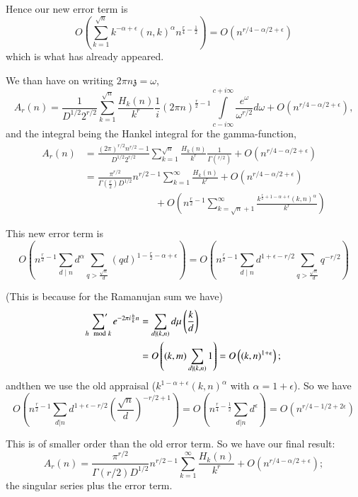 Hence our new error term is 
$$
O \left(\sum^{\sqrt{n}}_{k=1} k^{-\alpha + \epsilon} (n, k)^\alpha
n^{\frac{r}{4} - \frac{1}{2}}\right) = O \left(n^{r/4 -
  \alpha/2 + \epsilon} \right)
$$
which is what has already appeared.

We than have on writing $2 \pi n \mathfrak{z} = \omega$,
$$
A_r (n) = \frac{1}{D^{1/2} 2^{r/2}} \sum^{\sqrt{n}}_{k=1}
\frac{H_k(n)}{k^r} \frac{1}{i} (2 \pi n)^{\frac{r}{2}-1}
\int\limits^{c+ i \infty}_{c- i \infty} \frac{e^\omega}{\omega^{r/2}}
d \omega + O \left(n^{r/4- \alpha/2 + \epsilon} \right),
$$\pageoriginale
and the integral being the Hankel integral for the gamma-function,
\begin{align*}
  A_r (n) & = \frac{(2 \pi)^{r/2} n^{r/2}-1}{D^{1/2} 2^{r/2}}
  \sum^{\sqrt{n}}_{k=1} \frac{H_k (n)}{k^r} \frac{1}{\Gamma(^{r/2})} +
  O \left( n^{r/4 - \alpha/2 + \epsilon}\right)\\
  & = \frac{\pi^{r/2}}{\Gamma\left( \frac{r}{2}\right)D^{1/2}}
  n^{r/2-1} \sum^\infty_{k=1} \frac{H_k (n)}{k^r}+ O \left(
  n^{r/4- \alpha /2 + \epsilon}\right)\\ 
  & \hspace{3cm}+ O \left(n^{\frac{r}{2}-1}
  \sum^\infty_{k= \sqrt{n}+1}  \frac{k^{\frac{r}{2} +1 - \alpha + \epsilon}
    (k, n)^\alpha}{k^r}\right)
\end{align*}

This new error term is 
$$
O \left( n^{\frac{r}{2}-1} \sum_{d\mid n} d^\alpha \sum_{q>
  \frac{\sqrt{n}}{d}} (qd)^{1- \frac{r}{2} - \alpha + \epsilon} \right) =
O \left(n^{\frac{r}{2}-1} \sum_{d\mid n} d^{1+ \epsilon - r/2} \sum_{q>
    \frac{\sqrt{n}}{d}} q^{- r/2}  \right)
$$

(This is because for the Ramanujan sum we have)
\begin{align*}
  \sideset{}{'}\sum_{h \mod k} e^{-2 \pi i \frac{h}{k}n} & =
  \sum_{d|(k, n)} d \mu \left(\frac{k}{d} \right)\\
  & = O \left((k, m) \sum_{d| (k, n)} 1\right)= O \left(
  (k, n)^{1+\epsilon}\right);
\end{align*}
and\pageoriginale then we use the old appraisal ($k^{1-\alpha + \epsilon}(k, n)^\alpha$
with $\alpha= 1+\epsilon$). So we have
$$
O \left( n^{\frac{r}{2}-1} \sum_{d|n} d^{1+ \epsilon-r/2}
  \left( \frac{\sqrt{n}}{d}\right)^{- r/2+1}\right) =
O \left(n^{\frac{r}{4}-\frac{1}{2}} \sum_{d|n} d^\epsilon\right) =
O \left( n^{r/4- 1/2+ 2 \epsilon}\right)
$$

This is of smaller order than the old error term. So we have our final
result:
$$
A_r (n) = \frac{\pi^{r/2}}{\Gamma (r/2) D^{1/2}} n^{r/2-1}
\sum^\infty_{k=1} \frac{H_k (n)}{k^r} + O \left(n^{r/4 -
  \alpha/2 + \epsilon} \right);
$$
the singular series plus the error term. 

